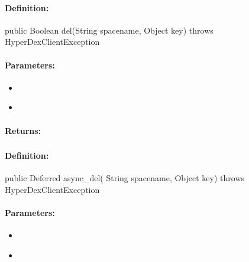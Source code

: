 \paragraph{Definition:}
\begin{javacode}
public Boolean del(String spacename, Object key) throws HyperDexClientException
\end{javacode}

\paragraph{Parameters:}
\begin{itemize}[noitemsep]
\item {}\\

\item {}\\

\end{itemize}

\paragraph{Returns:}


\pagebreak
\subsubsection{}
\label{api:java:async_del}


\paragraph{Definition:}
\begin{javacode}
public Deferred async_del(
        String spacename,
        Object key) throws HyperDexClientException
\end{javacode}

\paragraph{Parameters:}
\begin{itemize}[noitemsep]
\item {}\\

\item {}\\

\end{itemize}

